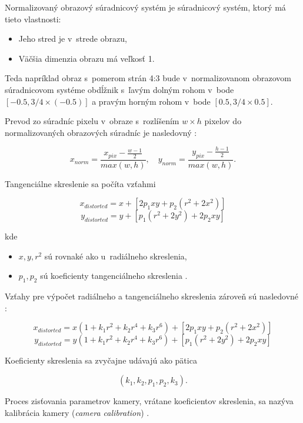 Normalizovaný obrazový súradnicový systém je súradnicový systém, ktorý má tieto vlastnosti:
\begin{itemize}
    \item Jeho stred je v~strede obrazu,
    \item Väčšia dimenzia obrazu má veľkosť 1.
\end{itemize}

Teda napríklad obraz s~pomerom strán 4:3 bude v~normalizovanom obrazovom súradnicovom systéme obdĺžnik s~ľavým dolným rohom v~bode $[-0.5, 3/4 \times (-0.5)]$ a pravým horným rohom v~bode $[0.5, 3/4 \times 0.5]$.

Prevod zo súradníc pixelu v~obraze s~rozlíšením $w \times h$ pixelov do normalizovaných obrazových súradníc je nasledovný \cite{opensfm_coordinate_systems}:

$$
x_{norm} = \frac{x_{pix} - \frac{w-1}{2}}{max(w, h)}
\mathrm{,} \quad
y_{norm} = \frac{y_{pix} - \frac{h-1}{2}}{max(w, h)}
\mathrm{.}
$$

Tangenciálne skreslenie sa počíta vzťahmi

$$x_{distorted} = x + [2 p_1 x y + p_2(r^2 + 2 x^2)]$$
$$y_{distorted} = y + [ p_1(r^2 + 2 y^2) + 2 p_2 x y]$$

kde

\begin{itemize}
    \item $x, y, r^2$ sú rovnaké ako u~radiálneho skreslenia,
    \item $p_1, p_2$ sú koeficienty tangenciálneho skreslenia \cite{opencv_camera_calibration}.
\end{itemize}

Vzťahy pre výpočet radiálneho a tangenciálneho skreslenia zároveň sú nasledovné \cite{sun_cooperstock_camera_calibration}:

$$x_{distorted} = x(1 + k_1 r^2 + k_2 r^4 + k_3 r^6) + [2 p_1 x y + p_2(r^2 + 2 x^2)]$$
$$y_{distorted} = y(1 + k_1 r^2 + k_2 r^4 + k_3 r^6) + [ p_1(r^2 + 2 y^2) + 2 p_2 x y]$$

Koeficienty skreslenia sa zvyčajne udávajú ako pätica \cite{opencv_camera_calibration}

$$(k_1, k_2, p_1, p_2, k_3)\mathrm{.}$$

Proces zisťovania parametrov kamery, vrátane koeficientov skreslenia, sa nazýva kalibrácia kamery (\emph{camera calibration}) \cite{matlab_camera_calibration}.

